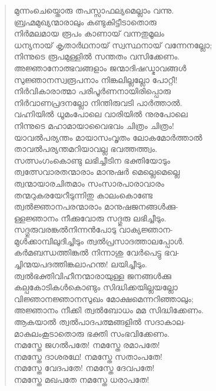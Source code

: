 \begin{verse}
മുന്നംചെയ്തൊരു തപസ്സാഫല്യമെല്ലാം വന്നു.\\
ബ്രഹ്മമുഖ്യന്മാരാലും കണ്ടുകിട്ടീടാതൊരു\\
നിര്‍മലമായ രൂപം കാണായ് വന്നതുമൂലം\\
ധന്യനായ് കൃതാര്‍ഥനായ് സ്വസ്ഥനായ് വന്നേനല്ലോ;\\
നിന്നുടെ രൂപമുള്ളില്‍ സന്തതം വസിക്കേണം.\\
അജ്ഞാനോത്ഭവങ്ങളാം ജന്മാദിഷഡ്ഭാവങ്ങള്‍\\
സുജ്ഞാനസ്വരൂപനാം നിങ്കലില്ലല്ലോ പോറ്റീ!\\
നിര്‍വികാരാത്മാ പരിപൂര്‍ണനായിരിപ്പൊരു\\
നിര്‍വാണപ്രദനല്ലോ നിന്തിരുവടി പാര്‍ത്താല്‍.\\
വഹ്നിയില്‍ ധൂമംപോലെ വാരിയില്‍ നുരപോലെ\\
നിന്നുടെ മഹാമായാവൈഭവം ചിത്രം ചിത്രം!\\
യാവല്‍പര്യന്തം മായാസംവൃതം ലോകമോര്‍ത്താല്‍\\
താവല്‍പര്യന്തമറിയാവല്ല ഭവത്തത്ത്വം.\\
സത്സംഗംകൊണ്ടു ലഭിച്ചീടിന ഭക്തിയോടും\\
ത്വത്സേവാരതന്മാരാം മാനുഷര്‍ മെല്ലെമെല്ലെ\\
ത്വന്മായാരചിതമാം സംസാരപാരാവാരം\\
തന്മറുകരയേറീടുന്നിതു കാലംകൊണ്ടേ\\
ത്വല്‍ജ്ഞാനപരന്മാരാം മാനുഷജനങ്ങള്‍ക്കു-\\
ള്ളജ്ഞാനം നീക്കുവോരു സദ്ഗുരു ലഭിച്ചീടും.\\
സദ്ഗുരുവരങ്കല്‍നിന്നന്‍പോടു വാക്യജ്ഞാന-\\
മുള്‍ക്കാമ്പിലുദിച്ചിടും ത്വല്‍പ്രസാദത്താലപ്പോള്‍.\\
കര്‍മബന്ധത്തിങ്കല്‍ നിന്നാശു വേര്‍പെട്ടു ഭവ-\\
ച്ചിന്മയപദത്തിങ്കലാഹന്ത! ലയിച്ചീടും.\\
ത്വല്‍ഭക്തിവിഹീനന്മാരായുള്ള ജനങ്ങള്‍ക്കു\\
കല്പകോടികള്‍കൊണ്ടും സിദ്ധിക്കയില്ലയല്ലോ\\
വിജ്ഞാനജ്ഞാനസുഖം മോക്ഷമെന്നറിഞ്ഞാലും;\\
അജ്ഞാനം നീക്കി ത്വല്‍ബോധം മമ സിദ്ധിക്കേണം.\\
ആകയാല്‍ ത്വല്‍പാദപത്മങ്ങളില്‍ സദാകാല-\\
മാകുലംകൂടാതൊരു ഭക്തി സംഭവിക്കേണം.\\
നമസ്തേ ജഗല്‍പതേ! നമസ്തേ രമാപതേ!\\
നമസ്തേ ദാശരഥേ! നമസ്തേ സതാംപതേ!\\
നമസ്തേ വേദപതേ! നമസ്തേ ദേവപതേ!\\
നമസ്തേ മഖപതേ നമസ്തേ ധരാപതേ!\\

\end{verse}
